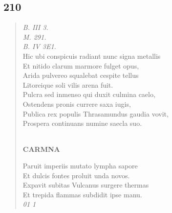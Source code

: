 \documentclass[11pt, a4paper]{report}
\begin{document}
            \subsection*{210}
      \begin{verse}
      \textit{B. III 3.} \\ \textit{M. 291.} \\ \textit{B. IV 3E1.} \\ Hic ubi conspicuis radiant nunc signa metallis \\ Et nitido clarum marmore fulget opus, \\ Arida pulvereo squalebat cespite tellus \\ Litoreique soli vilis arena fuit. \\ Pulcra sed inmenso qui duxit culmina caelo, \\ Ostendens pronis currere saxa iugis, \\ Publica rex populis Thrasamundus gaudia vovit, \\ Prospera continuans numine saecla suo. \\ 
        ﻿\pagebreak 
    \begin{center} \textbf{CARMNA} \end{center} \marginpar{[180]} Paruit imperiis mutato lympha sapore \\ Et dulcis fontes proluit unda novos. \\ Expavit subitas Vulcanus surgere thermas \\ Et trepida flammas subdidit ipse manu. \\ \textit{01 1} \\ 
      \end{verse}
  
\end{document}
